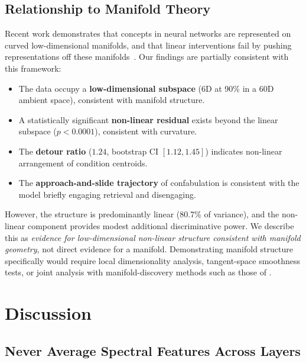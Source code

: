 \documentclass[11pt,a4paper]{article}
\begin{document}
\subsection{Relationship to Manifold Theory}

Recent work demonstrates that concepts in neural networks are
represented on curved low-dimensional manifolds, and that linear
interventions fail by pushing representations off these
manifolds~\citep{goodfire2026}. Our findings are partially consistent
with this framework:

\begin{itemize}
\item The data occupy a \textbf{low-dimensional subspace} (6D at 90\%
  in a 60D ambient space), consistent with manifold structure.
\item A statistically significant \textbf{non-linear residual} exists
  beyond the linear subspace ($p < 0.0001$), consistent with curvature.
\item The \textbf{detour ratio} ($1.24$, bootstrap CI $[1.12, 1.45]$)
  indicates non-linear arrangement of condition centroids.
\item The \textbf{approach-and-slide trajectory} of confabulation is
  consistent with the model briefly engaging retrieval and disengaging.
\end{itemize}

However, the structure is predominantly linear (80.7\% of variance),
and the non-linear component provides modest additional discriminative
power. We describe this as \emph{evidence for low-dimensional
non-linear structure consistent with manifold geometry}, not direct
evidence for a manifold. Demonstrating manifold structure specifically
would require local dimensionality analysis, tangent-space smoothness
tests, or joint analysis with manifold-discovery methods such as
those of \citet{goodfire2026}.

\section{Discussion}
\label{sec:discussion}

\subsection{Never Average Spectral Features Across Layers}
\end{document}
